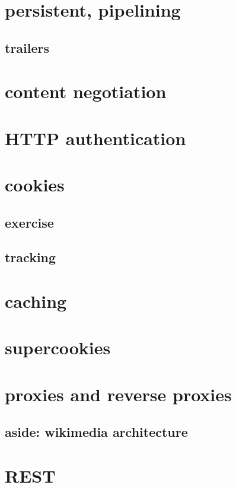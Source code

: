 \section{persistent, pipelining}


\subsection{trailers}


\section{content negotiation}


\section{HTTP authentication}

\section{cookies}


\subsection{exercise}


\subsection{tracking}


\section{caching}


\section{supercookies}


\section{proxies and reverse proxies}


\subsection{aside: wikimedia architecture}



\section{REST}


